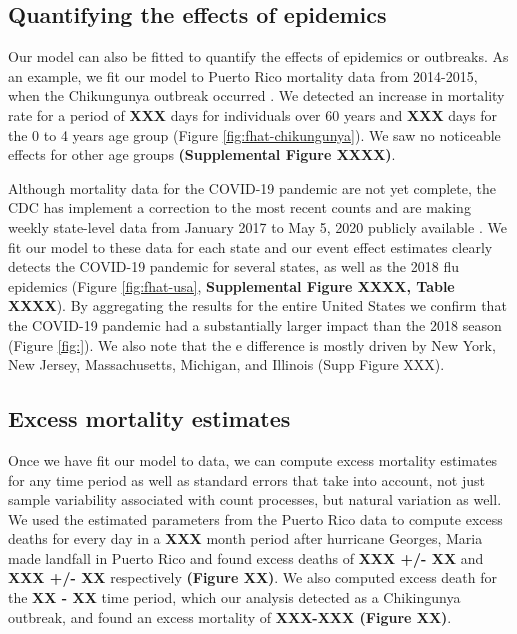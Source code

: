 \documentclass[11pt]{article}
\begin{document}
\subsection{Quantifying the effects of epidemics}
\label{subsec:epidemics}
Our model can also be fitted to quantify the effects of epidemics or outbreaks. As an example, 
we fit our model to Puerto Rico mortality data from 2014-2015, when the Chikungunya outbreak occurred \cite{sharp2016surveillance, hsu2019risk}. We detected an increase in mortality rate for a period of \textbf{XXX} days for individuals over 60 years and \textbf{XXX} days for the 0 to 4 years age group (Figure \ref{fig:fhat-chikungunya}). We saw no noticeable effects for other age groups \textbf{(Supplemental Figure XXXX)}.

Although mortality data for the COVID-19 pandemic are not yet complete, the CDC has implement a correction to the most recent counts and are making weekly state-level data from January 2017 to May 5, 2020 publicly available \cite{cdc2020covid19}. We fit our model to these data for each state and our event effect estimates clearly detects the COVID-19 pandemic for several states, as well as the 2018 flu epidemics (Figure \ref{fig:fhat-usa}, \textbf{Supplemental Figure XXXX, Table XXXX}). By aggregating the results for the entire United States we confirm that the COVID-19 pandemic had a substantially larger impact than the 2018 season (Figure \ref{fig:}). We also note that the e difference is mostly driven by New York, New Jersey, Massachusetts, Michigan, and Illinois (Supp Figure XXX).

\subsection{Excess mortality estimates}
\label{subsec:excess-mortality}
Once we have fit our model to data, we can compute excess mortality estimates for any time period as well as standard errors that take into account, not just sample variability associated with count processes, but natural variation as well. We used the estimated parameters from the Puerto Rico data to compute excess deaths for every day in a \textbf{XXX} month period after hurricane Georges, Maria made landfall in Puerto Rico and found excess deaths of \textbf{XXX +/- XX} and \textbf{XXX +/- XX} respectively \textbf{(Figure XX)}. We also computed excess death for the \textbf{XX - XX} time period, which our analysis detected as a Chikingunya outbreak, and found an excess mortality of \textbf{XXX-XXX (Figure XX)}. \\ 
\end{document}
